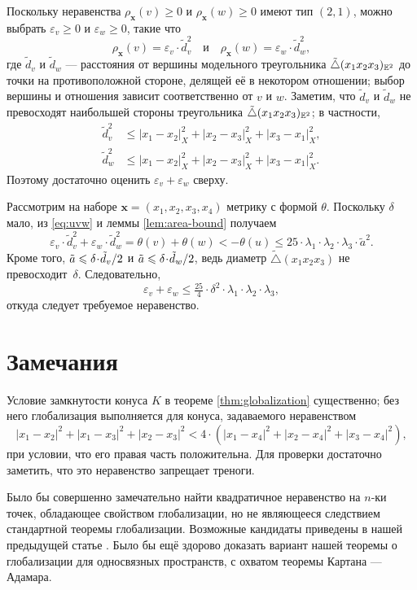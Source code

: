 Поскольку неравенства $\rho_{\bm{x}}(v)\geqslant 0$ и $\rho_{\bm{x}}(w)\geqslant 0$ имеют тип $(2,1)$, можно выбрать $\varepsilon_v\geqslant 0$ и $\varepsilon_w\geqslant 0$, такие что
\[\rho_{\bm{x}}(v)=\varepsilon_v\cdot \tilde d_v^2
\quad\text{и}\quad
 \rho_{\bm{x}}(w)=\varepsilon_w\cdot \tilde d_w^2,
\]
где
$\tilde d_v$ и $\tilde d_w$ --- расстояния от вершины модельного треугольника $\tilde\triangle(x_1x_2x_3)_{\mathbb{E}^2}$ до точки на противоположной стороне, делящей её в некотором отношении; выбор вершины и отношения зависит соответственно от $v$ и $w$.
Заметим, что $\tilde d_v$ и $\tilde d_w$ не превосходят наибольшей стороны треугольника $\tilde\triangle(x_1x_2x_3)_{\mathbb{E}^2}$;
в частности,
\begin{align*}
\tilde d_v^2&\leqslant |x_1-x_2|_X^2+|x_2-x_3|_X^2+|x_3-x_1|_X^2,
\\
\tilde d_w^2&\leqslant |x_1-x_2|_X^2+|x_2-x_3|_X^2+|x_3-x_1|_X^2.
\end{align*}
Поэтому достаточно оценить $\varepsilon_v+\varepsilon_w$ сверху.

Рассмотрим на наборе  $\bm{x}=(x_1,x_2,x_3,x_4)$ метрику с формой $\theta$.
Поскольку $\delta$ мало, из \ref{eq:uvw} и леммы \ref{lem:area-bound} получаем
\[\varepsilon_v\cdot \tilde d_v^2+\varepsilon_w\cdot \tilde d_w^2=\theta(v)+\theta(w)
<
-\theta(u)
\leqslant
25\cdot\lambda_1\cdot\lambda_2\cdot\lambda_3\cdot\tilde a^2.\]
Кроме того, $\tilde a\z\leqslant \delta\cdot \tilde d_v/2$ и
$\tilde a\z\leqslant \delta\cdot \tilde d_w/2$, ведь диаметр $\tilde\triangle(x_1x_2x_3)$ не превосходит~$\delta$.
Следовательно,
\[\varepsilon_v+\varepsilon_w\leqslant \tfrac{25}4\cdot \delta^2\cdot\lambda_1\cdot\lambda_2\cdot\lambda_3,\]
откуда следует требуемое неравенство.
\qeds

\section{Замечания}

Условие замкнутости конуса $K$ в теореме \ref{thm:globalization} существенно;
без него глобализация выполняется для конуса, задаваемого неравенством
\[|x_1-x_2|^2+|x_1-x_3|^2+|x_2-x_3|^2<4\cdot(|x_1-x_4|^2+|x_2-x_4|^2+|x_3-x_4|^2),\]
при условии, что его правая часть положительна.
Для проверки достаточно заметить, что это неравенство запрещает треноги.

Было бы совершенно замечательно найти квадратичное неравенство на $n$-ки точек, обладающее свойством глобализации, но не являющееся следствием стандартной теоремы глобализации.
Возможные кандидаты приведены в нашей предыдущей статье \cite{lebedeva-petrunin-zolotov}.
Было бы ещё здорово доказать вариант нашей теоремы о глобализации для односвязных пространств, с охватом теоремы Картана --- Адамара.

